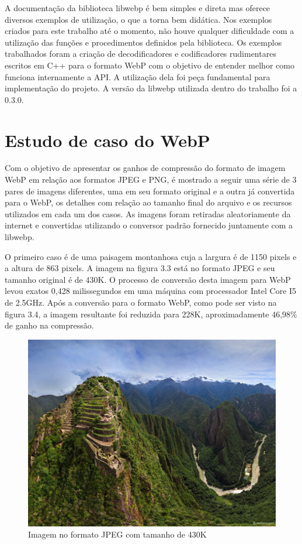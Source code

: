 \documentclass[espaco=simples,appendix=Name]{abnt}
\begin{document}
A documentação da biblioteca libwebp é bem simples e direta mas oferece diversos exemplos de utilização, o que a torna bem didática. Nos exemplos criados para este trabalho até o momento, não houve qualquer dificuldade com a utilização das funções e procedimentos definidos pela biblioteca. Os exemplos trabalhados foram a criação de decodificadores e codificadores rudimentares escritos em C++ para o formato WebP com o objetivo de entender melhor como funciona internamente a API. A utilização dela foi peça fundamental para implementação do projeto. A versão da libwebp utilizada dentro do trabalho foi a 0.3.0.

\section{Estudo de caso do WebP}

Com o objetivo de apresentar os ganhos de compressão do formato de imagem WebP em relação aos formatos JPEG e PNG, é mostrado a seguir uma série de 3 pares de imagens diferentes, uma em seu formato original e a outra já convertida para o WebP, os detalhes com relação ao tamanho final do arquivo e os recursos utilizados em cada um dos casos. As imagens foram retiradas aleatoriamente da internet e convertidas utilizando o conversor padrão fornecido juntamente com a libwebp.

O primeiro caso é de uma paisagem montanhosa cuja a largura é de 1150 pixels e a altura de 863 pixels. A imagem na figura 3.3 está no formato JPEG e seu tamanho original é de 430K. O processo de conversão desta imagem para WebP levou exatos 0,428 milissegundos em uma máquina com processador Intel Core I5 de 2.5GHz. Após a conversão para o formato WebP, como pode ser visto na figura 3.4, a imagem resultante foi reduzida para 228K, aproximadamente 46,98\% de ganho na compressão.

\begin{figure}[h]
  \centering
    \includegraphics[scale=0.5]{Imagem1JPEG.png}
  \caption{Imagem no formato JPEG com tamanho de 430K}
\end{figure}
\end{document}
